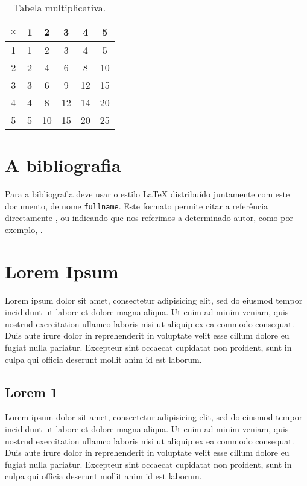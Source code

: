 \documentclass[a4paper, twocolumn, 11pt, twoside]{article}
\begin{document}
\begin{table}[h]
  \centering
  \begin{tabular}{|c|ccccc|}
    \hline
    $\times$ & 1 & 2 & 3 & 4 & 5 \\
    \hline
     1 & 1 & 2 & 3 & 4 & 5 \\
     2 & 2 & 4 & 6 & 8 & 10 \\
     3 & 3 & 6 & 9 & 12 & 15 \\
     4 & 4 & 8 & 12 & 14 & 20 \\
     5 & 5 & 10 & 15 & 20 & 25 \\
     \hline
  \end{tabular}
  \caption{Tabela multiplicativa.}
\end{table}

\section{A bibliografia}

Para a bibliografia deve usar o estilo \LaTeX{} distribuído juntamente
com este documento, de nome \verb.fullname.. Este formato permite
citar a referência directamente \cite{linguamatica:1:09:forcada}, ou
indicando que nos referimos a determinado autor, como por exemplo,
.

\section{Lorem Ipsum}

Lorem ipsum dolor sit amet, consectetur adipisicing elit, sed do eiusmod
tempor incididunt ut labore et dolore magna aliqua. Ut enim ad minim
veniam, quis nostrud exercitation ullamco laboris nisi ut aliquip ex ea
commodo consequat. Duis aute irure dolor in reprehenderit in voluptate
velit esse cillum dolore eu fugiat nulla pariatur. Excepteur sint
occaecat cupidatat non proident, sunt in culpa qui officia deserunt
mollit anim id est laborum.

\subsection{Lorem 1}

Lorem ipsum dolor sit amet, consectetur adipisicing elit, sed do eiusmod
tempor incididunt ut labore et dolore magna aliqua. Ut enim ad minim
veniam, quis nostrud exercitation ullamco laboris nisi ut aliquip ex ea
commodo consequat. Duis aute irure dolor in reprehenderit in voluptate
velit esse cillum dolore eu fugiat nulla pariatur. Excepteur sint
occaecat cupidatat non proident, sunt in culpa qui officia deserunt
mollit anim id est laborum.
\end{document}

